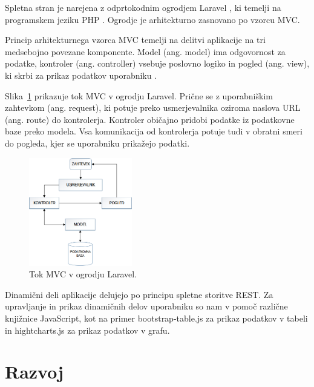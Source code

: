 \documentclass[a4paper, 12pt]{book}
\begin{document}
Spletna stran je narejena z odprtokodnim ogrodjem Laravel \cite{laravel-main-page}, ki temelji na programskem jeziku PHP \cite{php-jezik}. Ogrodje je arhitekturno zasnovano po vzorcu MVC. 

Princip arhitekturnega vzorca MVC temelji na delitvi aplikacije na tri medsebojno povezane komponente. Model (ang. model) ima odgovornost za podatke, kontroler (ang. controller) vsebuje poslovno logiko in pogled (ang. view), ki skrbi za prikaz podatkov uporabniku \cite{poglavje_laravel_mvc}.

Slika~\ref{mvc-laravel} prikazuje tok MVC v ogrodju Laravel. Prične se z uporabniškim zahtevkom (ang. request), ki potuje preko usmerjevalnika oziroma naslova URL (ang. route) do kontrolerja. Kontroler običajno pridobi podatke iz podatkovne baze preko modela. Vsa komunikacija od kontrolerja potuje tudi v obratni smeri do pogleda, kjer se uporabniku prikažejo podatki. 

\begin{figure}[h]
\begin{center}
\includegraphics[width=0.4\textwidth]{slike/Laravel-MVC.png}
\end{center}
\caption{Tok MVC v ogrodju Laravel.}
\label{mvc-laravel}
\end{figure}

\clearpage

Dinamični deli aplikacije delujejo po principu spletne storitve REST. Za upravljanje in prikaz dinamičnih delov uporabniku so nam v pomoč različne knjižnice JavaScript, kot na primer bootstrap-table.js \cite{bootstraptable} za prikaz podatkov v tabeli in hightcharts.js \cite{hightchars-js} za prikaz podatkov v grafu.






\chapter{Razvoj}
\label{razvoj}
\end{document}
